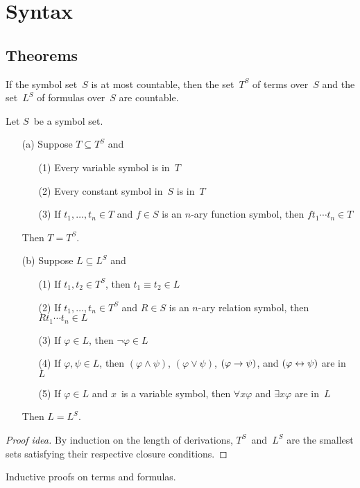 %
%
%
\section{Syntax}
\subsection*{Theorems}

\begin{thm}
If the symbol set~\(S\) is at most countable, then the set~\(T^S\) of terms over~\(S\) and the set~\(L^S\) of formulas over~\(S\) are countable.
\end{thm}

\begin{thm}
Let \(S\)~be a symbol set.
\begin{enumerate}[itemsep=0pt]
\item[(a)] Suppose \(T\subseteq T^S\) and
\begin{enumerate}[itemsep=0pt]
\item[(1)] Every variable symbol is in~\(T\)
\item[(2)] Every constant symbol in~\(S\) is in~\(T\)
\item[(3)] If \(t_1,\ldots,t_n\in T\) and \(f\in S\) is an \(n\)-ary function symbol, then \(ft_1\cdots t_n\in T\)
\end{enumerate}
Then \(T=T^S\).

\item[(b)] Suppose \(L\subseteq L^S\) and
\begin{enumerate}[itemsep=0pt]
\item[(1)] If \(t_1,t_2\in T^S\), then \(t_1\equiv t_2\in L\)
\item[(2)] If \(t_1,\ldots,t_n\in T^S\) and \(R\in S\) is an \(n\)-ary relation symbol, then \(Rt_1\cdots t_n\in L\)
\item[(3)] If \(\varphi\in L\), then \(\lnot\varphi\in L\)
\item[(4)] If \(\varphi,\psi\in L\), then \((\varphi\land\psi)\), \((\varphi\lor\psi)\), \((\varphi\rightarrow\psi)\), and \((\varphi\leftrightarrow\psi)\) are in~\(L\)
\item[(5)] If \(\varphi\in L\) and \(x\)~is a variable symbol, then \(\forall x\varphi\) and \(\exists x\varphi\) are in~\(L\)
\end{enumerate}
Then \(L=L^S\).
\end{enumerate}
\end{thm}
\begin{proof}[Proof idea]
By induction on the length of derivations, \(T^S\)~and~\(L^S\) are the smallest sets satisfying their respective closure conditions.
\end{proof}
\begin{app}
Inductive proofs on terms and formulas.
\end{app}

